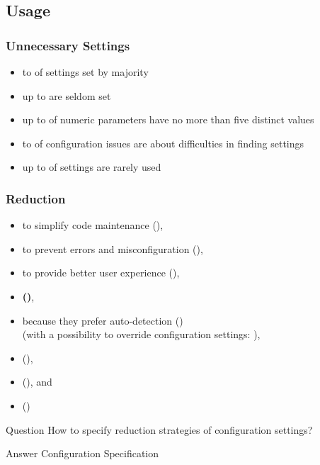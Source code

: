 \subsection{Usage}

\begin{frame}
	\frametitle{Unnecessary Settings~\cite{xu2015hey}}
	\begin{itemize}
	\item {} to  of settings set by majority
	\item up to  are seldom set
	\item up to  of numeric parameters have no more than five distinct values
	\item {} to  of configuration issues are about difficulties in finding settings
	\item up to  of settings are rarely used
	\end{itemize}
\end{frame}

\begin{frame}
	\frametitle{Reduction}
	\methodQuestion{}
	\begin{itemize}
	\item to simplify code maintenance (),
	\item to prevent errors and misconfiguration (),
	\item to provide better user experience (),
	\item \textbf{ ()},
	\item because they prefer auto-detection () \\ (with a possibility to override configuration settings: ),
	\item {} (),
	\item {} (), and
	\item {} ()
	\end{itemize}
\end{frame}

\begin{frame}
	\begin{alertblock}{Question}
	How to specify reduction strategies of configuration settings?
	\end{alertblock}
	\pause
	\begin{exampleblock}{Answer}
	Configuration Specification
	\end{exampleblock}
\end{frame}

